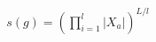 \documentclass[preview]{standalone}
\begin{document}
\begin{align*}
s(g) = \left(\prod_{i=1}^{l}\left|X_a\right|\right)^{L/l}
\end{align*}
\end{document}
